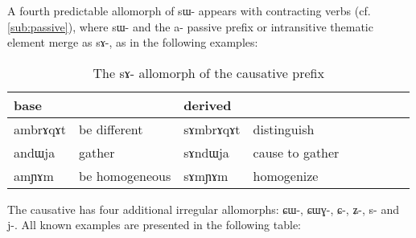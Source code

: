 \documentclass[oldfontcommands,oneside,a4paper,11pt]{memoir}
\newcommand{\ipa}[1]{{\phon #1}} %
\begin{document}
A fourth predictable allomorph of \ipa{sɯ-} appears with contracting verbs (cf. \ref{sub:passive}), where \ipa{sɯ-}  and the \ipa{a-} passive prefix or intransitive thematic element merge as \ipa{sɤ-}, as in the following examples:
\begin{table}[H]
\caption{The \ipa{sɤ}-   allomorph  of the causative prefix}\label{tab:causative.sA}
\begin{tabular}{lllllllll} \toprule
  base & & derived & \\
 \midrule
 \ipa{ambrɤqɤt} & be different & \ipa{sɤmbrɤqɤt} & distinguish \\
\ipa{andɯja} & gather & \ipa{sɤndɯja} & cause to gather \\
 \ipa{amɲɤm} & be homogeneous & \ipa{sɤmɲɤm} & homogenize \\
 \bottomrule
\end{tabular}
\end{table}

The causative has four additional irregular allomorphs: \ipa{ɕɯ-}, \ipa{ɕɯɣ-}, \ipa{ɕ-}, \ipa{ʑ-}, \ipa{s-} and \ipa{j-}. All known examples are presented in the following table:
\end{document}
